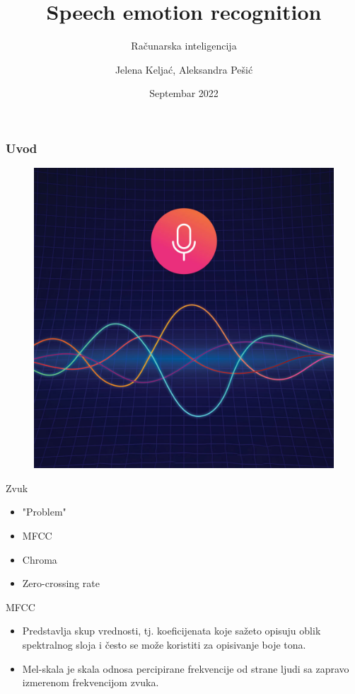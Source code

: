 \documentclass{beamer}
\title{Speech emotion recognition}
\subtitle{Računarska inteligencija}
\author{Jelena Keljać, Aleksandra Pešić}
\institute{Matematički fakultet}
\date{Septembar 2022}
\begin{document}
\begin{frame}
\titlepage
\end{frame}
    
\begin{frame}
\frametitle{Uvod}
\begin{figure}[t]
\centering
\includegraphics[scale=0.2]{im1.jpg}
\end{figure}
\end{frame}

\begin{frame}{Zvuk}
\begin{itemize}
    \item "Problem"
    \item MFCC
    \item Chroma
    \item Zero-crossing rate
\end{itemize}
\end{frame}

\begin{frame}{MFCC}
\begin{itemize}
    \item Predstavlja skup vrednosti, tj. koeficijenata koje sažeto opisuju oblik spektralnog sloja i često se može koristiti za opisivanje boje tona. 
     \item Mel-skala je skala odnosa percipirane frekvencije od strane ljudi sa zapravo izmerenom frekvencijom zvuka.
\end{itemize}
\end{frame}
\end{document}
